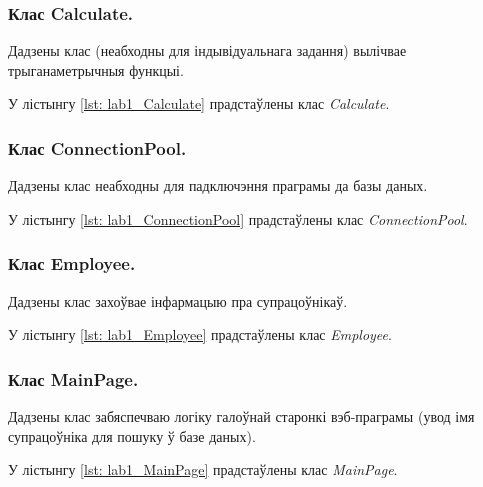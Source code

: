 \subsubsection{Клас Calculate.}

Дадзены клас (неабходны для індывідуальнага задання) вылічвае
трыганаметрычныя функцыі.

У лістынгу \ref{lst: lab1_Calculate} прадстаўлены клас
\textit{Calculate}.



\subsubsection{Клас ConnectionPool.}

Дадзены клас неабходны для падключэння праграмы да базы даных.

У лістынгу \ref{lst: lab1_ConnectionPool} прадстаўлены клас
\textit{ConnectionPool}.



\subsubsection{Клас Employee.}

Дадзены клас захоўвае інфармацыю пра супрацоўнікаў.

У лістынгу \ref{lst: lab1_Employee} прадстаўлены клас
\textit{Employee}.



\subsubsection{Клас MainPage.}

Дадзены клас забяспечваю логіку галоўнай старонкі вэб-праграмы
(увод імя супрацоўніка для пошуку ў базе даных).

У лістынгу \ref{lst: lab1_MainPage} прадстаўлены клас
\textit{MainPage}.


